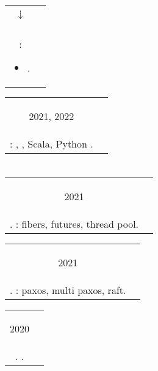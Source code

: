 \documentclass{article}
\newif\ifen
\newif\ifru
\newcommand{\en}[1]{\ifen#1\fi}
\newcommand{\ru}[1]{\ifru#1\fi}
\newcommand{\entry}[3]{
	\begin{tabular}{ c | c }
    \begin{minipage}{0.05\linewidth}
    	\begin{center}
    		#1
    	\end{center}
    \end{minipage} 
    &
    \begin{minipage}{0.85\linewidth}
        \textbf{#2} \\ \footnotesize{#3}
    \end{minipage}
    \end{tabular}
}
\newcommand{\interval}[2]{
	#1 \\ $\downarrow$ \\ #2
}
\begin{document}
        \entry {\interval{\ru{Авг.}\en{Aug.} 2022}{\ru{н.в.}\en{today}}}
        {Mosaic Research - Crypto HFT - Backend \ru{разработчик}\en{engineer}}
        {\ru{Бэкенд разработка на C\texttt{++}}\en{Backend C\texttt{++} development}: 
        	\begin{itemize}
        		\item \ru{Разработка и поддержка инфраструктуры для торговли криптовалютами} \en{Development and maintenance of infrastructure for crypto trading}.
        	\end{itemize}
        }
        
        \vspace{.1cm}
        
        \entry {2021, 2022}
        {\ru{Летняя школа Слон в Пущино}\en{Summer school <<Slon>> in Pushchino} - \ru{Волонтер-преподаватель}\en{Volunteer-tutor}}
        {\ru{Проведение курсов}\en{Courses taught}: \ru{Формальные языки}\en{Formal languages}, \ru{Математическая логика}\en{Mathematical logic}, \ru{ФП в }\en{FP in} Scala, Python \ru{с нуля}\en{from scratch}.
    	}  

    \section{\ru{Курсы}}
    \entry {2021
        }
        {\ru{МФТИ}\en{MIPT} - \ru{Теория и практика многопоточной синхронизации}\en{Concurrency course} }
        {\ru{Язык C\texttt{++}}\en{C\texttt{++}}. \ru{Реализация библиотеки для работы с многопоточностью}\en{Implementation of simple concurrency library}: fibers, futures, thread pool.  }
    
    \vspace{.1cm}
    
    \entry {2021
        }
        {\ru{МФТИ}\en{MIPT} - \ru{Распределенные системы}\en{Distributed systems} }
        {\ru{Язык C\texttt{++}}\en{C\texttt{++}}. \ru{Реализация алгоритмов распределенных консенсуса и репликации}\en{Implementation of distributed consensus and replication algorithms}: paxos, multi paxos, raft.  }
    
    \vspace{.1cm}
    
    \entry {2020
        }
        {\ru{Тинькофф.Финтех}\en{Tinkoff.Fintech} - \ru{Курс разработки на Scala}\en{Scala development course} }
        { \ru{Язык Scala}\en{Scala}. \ru{Разработка RESTful сервиса StopLoss-TakeProfit для тинькофф инвестиций}\en{Impementation of StopLoss-TakeProfit service integrated with tinkoff.investments}. }
    
\end{document}
